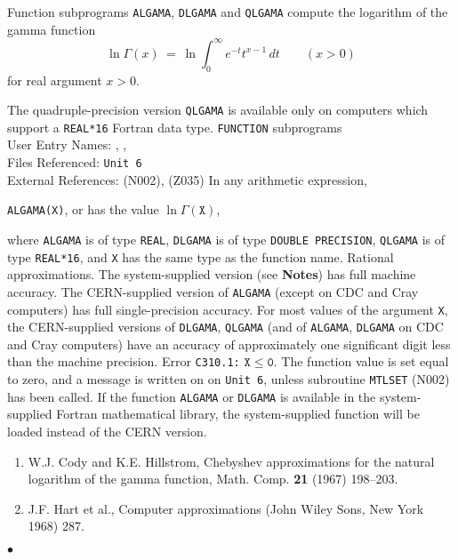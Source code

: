         
 
\Submitter{}                             
                       
Function subprograms {\tt ALGAMA}, {\tt DLGAMA} and {\tt QLGAMA}
compute the logarithm of the gamma function
$$\displaystyle \ln \Gamma(x) \ = \
\ln \int_0^\infty e^{-t} t^{x-1}\, dt \qquad (x>0) $$
for real argument $x>0$.
\par
The quadruple-precision version {\tt QLGAMA} is available only on
computers which support a {\tt REAL*16} Fortran data type.
\Structure
{\tt FUNCTION} subprograms \\
User Entry Names: , ,   \\
Files Referenced: {\tt Unit 6} \\
External References:  (N002),  (Z035)
\Usage
In any arithmetic expression,
\begin{center}
{\tt ALGAMA(X)},  \quad or 
\quad has the value \quad $\ln \Gamma(\mathtt{X})$,
\end{center}
where {\tt ALGAMA} is of type {\tt REAL}, {\tt DLGAMA} is of type
{\tt DOUBLE PRECISION}, {\tt QLGAMA} is of type {\tt REAL*16},
and {\tt X} has the same type as the function name.
\Method
Rational approximations.
\Accuracy
The system-supplied version (see {\bf Notes}) has full machine
accuracy.
The CERN-supplied version of {\tt ALGAMA} (except on CDC and Cray
computers) has full single-precision accuracy.
For most values of the argument {\tt X},
the CERN-supplied versions of {\tt DLGAMA}, {\tt QLGAMA}
(and of {\tt ALGAMA}, {\tt DLGAMA}
on CDC and Cray computers) have an accuracy of approximately one
significant digit less than the machine precision.
\Errorh
Error {\tt C310.1:}  $\mathtt{X \leq 0}$.
The function value is set equal to zero, and a message is written on
on {\tt Unit 6}, unless subroutine {\tt MTLSET} (N002) has been called.
\Notes
If the function {\tt ALGAMA} or {\tt DLGAMA} is available in the
system-supplied Fortran mathematical library, the system-supplied
function will be loaded instead of the CERN version.
\Refer
\begin{enumerate}
\item  W.J. Cody and K.E. Hillstrom, Chebyshev approximations
for the natural logarithm of the gamma function,
Math. Comp. {\bf 21} (1967) 198--203.
\item  J.F. Hart et al., Computer approximations (John Wiley
 Sons, New York 1968) 287.
\end{enumerate}
$\bullet$
